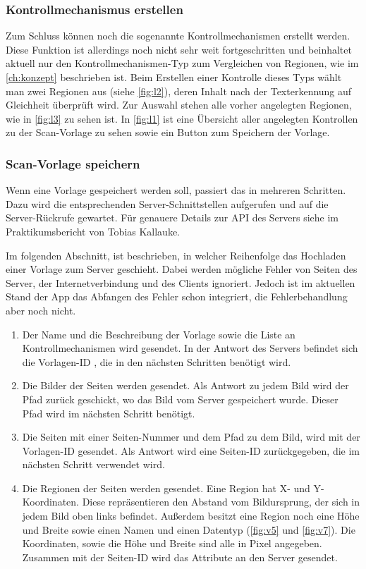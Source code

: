 \documentclass[notables, nomenclature, oneside, 150]{HSMW-Thesis}
\begin{document}
			\subsubsection*{Kontrollmechanismus erstellen}
			Zum Schluss können noch die sogenannte Kontrollmechanismen erstellt werden. Diese Funktion ist allerdings noch nicht sehr weit fortgeschritten und beinhaltet aktuell nur den Kontrollmechanismen-Typ zum Vergleichen von Regionen, wie im \autoref{ch:konzept} beschrieben ist. Beim Erstellen einer Kontrolle dieses Typs wählt man zwei Regionen aus (siehe \autoref{fig:l2}), deren Inhalt nach der Texterkennung auf Gleichheit überprüft wird. Zur Auswahl stehen alle vorher angelegten Regionen, wie in \autoref{fig:l3} zu sehen ist. In \autoref{fig:l1} ist eine Übersicht aller angelegten Kontrollen zu der Scan-Vorlage zu sehen sowie ein Button zum Speichern der Vorlage.

			\subsubsection*{Scan-Vorlage speichern}
			Wenn eine Vorlage gespeichert werden soll, passiert das in mehreren Schritten. Dazu wird die entsprechenden Server-Schnittstellen aufgerufen und auf die Server-Rückrufe gewartet. Für genauere Details zur API des Servers siehe im Praktikumsbericht von Tobias Kallauke.
			
			Im folgenden Abschnitt, ist beschrieben, in welcher Reihenfolge das Hochladen einer Vorlage zum Server geschieht. Dabei werden mögliche Fehler von Seiten des Server, der Internetverbindung und des Clients ignoriert. Jedoch ist im aktuellen Stand der App das Abfangen des Fehler schon integriert, die Fehlerbehandlung aber noch nicht.
			\begin{enumerate}
				\item Der Name und die Beschreibung der Vorlage sowie die Liste an Kontrollmechanismen wird gesendet. In der Antwort des Servers befindet sich  die Vorlagen-ID , die in den nächsten Schritten benötigt wird. 
				\item Die Bilder der Seiten werden gesendet. Als Antwort zu jedem Bild wird der Pfad zurück geschickt, wo das Bild vom Server gespeichert wurde. Dieser Pfad wird im nächsten Schritt benötigt.
				\item Die Seiten mit einer Seiten-Nummer und dem Pfad zu dem Bild, wird mit der Vorlagen-ID gesendet. Als Antwort wird eine Seiten-ID zurückgegeben, die im nächsten Schritt verwendet wird.
				\item Die Regionen der Seiten werden gesendet. Eine Region hat X- und Y-Koordinaten. Diese repräsentieren den Abstand vom Bildursprung, der sich in jedem Bild oben links befindet. Außerdem besitzt eine Region noch eine Höhe und Breite sowie einen Namen und einen Datentyp (\ref{fig:v5} und \ref{fig:v7}). Die Koordinaten, sowie die Höhe und Breite sind alle in Pixel angegeben. Zusammen mit der Seiten-ID wird das Attribute an den Server gesendet.
			\end{enumerate}
			
\end{document}
